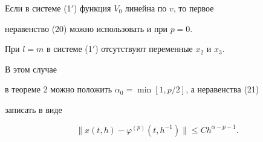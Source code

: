  


\begin{note} 


Если в системе (1${}'$) функция $V_0$ линейна по $v$, то первое 


неравенство (20) можно использовать и при $p=0$. 


\end{note} 


 


\begin{note} 


При $l=m$ в системе (1${}'$) отсутствуют переменные $x_2$ и $x_3$. 


В этом случае 


в теореме 2 можно положить $\alpha_0=\min[1,p/2]$, а неравенства (21) 


записать в виде 


$$ 


\|x(t,h)-\varphi^{(p)}(t,h^{-1})\|\le C h^{\alpha-p-1}. 


$$ 


\end{note} 


 


